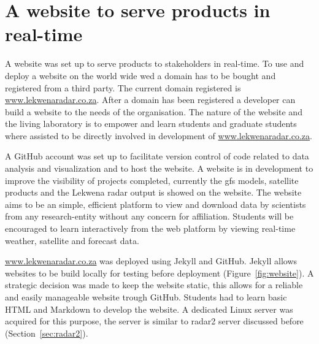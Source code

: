 \documentclass{wrcreport}
\begin{document}
\section{A website to serve products in real-time}

A website was set up to serve products to stakeholders in real-time.
To use and deploy a website on the world wide wed a domain has to be
bought and registered from a third party. The current domain
registered is \url{www.lekwenaradar.co.za}. After a domain has been
registered a developer can build a website to the needs of the
organisation. The nature of the website and the living laboratory is
to empower and learn students and graduate students where assisted to
be directly involved in development of \url{www.lekwenaradar.co.za}.

A GitHub account was set up to facilitate version control of code
related to data analysis and visualization and to host the website. A
website is in development to improve the visibility of projects
completed, currently the \gls{gfs} models, satellite products and the
Lekwena radar output is showed on the website. The website aims to be
an simple, efficient platform to view and download data by scientists
from any research-entity without any concern for affiliation. Students
will be encouraged to learn interactively from the web platform by
viewing real-time weather, satellite and forecast data.

\url{www.lekwenaradar.co.za} was deployed using Jekyll and GitHub.
Jekyll allows websites to be build locally for testing before
deployment (Figure~\ref{fig:website}). A strategic decision was made
to keep the website static, this allows for a reliable and easily
manageable website trough GitHub. Students had to learn basic HTML and
Markdown to develop the website. A dedicated Linux server was acquired
for this purpose, the server is similar to radar2 server discussed
before (Section~\ref{sec:radar2}).
\end{document}
